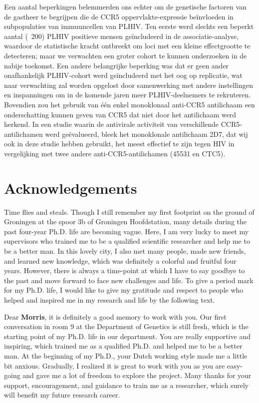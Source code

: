 \documentclass{book}
\begin{document}
\begin{refsection}
Een aantal beperkingen belemmerden ons echter om de genetische factoren van de gastheer te begrijpen die de CCR5 oppervlakte-expressie beïnvloeden in subpopulaties van immuuncellen van PLHIV.
Ten eerste werd slechts een beperkt aantal (~200) PLHIV positieve mensen geïncludeerd in de associatie-analyse, waardoor de statistische kracht ontbreekt om loci met een kleine effectgrootte te detecteren; maar we verwachten een groter cohort te kunnen onderzoeken in de nabije toekomst.
Een andere belangrijke beperking was dat er geen ander onafhankelijk PLHIV-cohort werd geïncludeerd met het oog op replicatie, wat naar verwachting zal worden opgelost door samenwerking met andere instellingen en inspanningen om in de komende jaren meer PLHIV-deelnemers te rekruteren.
Bovendien zou het gebruik van één enkel monoklonaal anti-CCR5 antilichaam een onderschatting kunnen geven van CCR5 dat niet door het antilichaam werd herkend.
In een studie waarin de antivirale activiteit van verschillende CCR5-antilichamen werd geëvalueerd, bleek het monoklonale antilichaam 2D7, dat wij ook in deze studie hebben gebruikt, het meest effectief te zijn tegen HIV in vergelijking met twee andere anti-CCR5-antilichamen (45531 en CTC5).


\clearpage
\newpage
{}
\section*{Acknowledgements}
Time flies and steals.
Though I still remember my first footprint on the ground of Groningen at the spoor 3b of Groningen Hoofdstation, many details during the past four-year Ph.D. life are becoming vague.
Here, I am very lucky to meet my supervisors who trained me to be a qualified scientific researcher and help me to be a better man.
In this lovely city, I also met many people, made new friends, and learned new knowledge, which was definitely a colorful and fruitful four years.
However, there is always a time-point at which I have to say goodbye to the past and move forward to face new challenges and life.
To give a period mark for my Ph.D. life, I would like to give my gratitude and respect to people who helped and inspired me in my research and life by the following text.

Dear \textbf{Morris}, it is definitely a good memory to work with you.
Our first conversation in room 9 at the Department of Genetics is still fresh, which is the starting point of my Ph.D. life in our department.
You are really supportive and inspiring, which trained me as a qualified Ph.D. and helped me to be a better man.
At the beginning of my Ph.D., your Dutch working style made me a little bit anxious.
Gradually, I realized it is great to work with you as you are easy-going and gave me a lot of freedom to explore the project.
Many thanks for your support, encouragement, and guidance to train me as a researcher, which surely will benefit my future research career.


\end{refsection}
\end{document}
